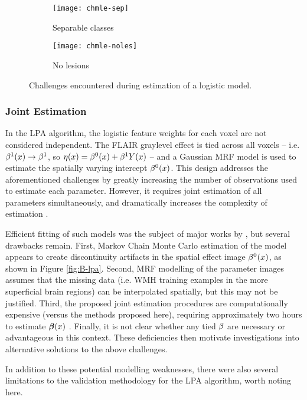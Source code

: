\begin{figure}
  \centering
  \begin{subfigure}{\plotwidth}\texttt{[image: chmle-sep]}  \caption{Separable classes}\label{fig:chmle-sep}  \end{subfigure}
  \begin{subfigure}{\plotwidth}\texttt{[image: chmle-noles]}\caption{No lesions}       \label{fig:chmle-noles}\end{subfigure}
  \caption{Challenges encountered during estimation of a logistic model.}
  \label{fig:chmle}
\end{figure}
\subsubsection{Joint Estimation}
In the LPA algorithm, the logistic feature weights for each voxel are not considered independent.
The FLAIR graylevel effect is tied across all voxels -- i.e. $\beta^1(x) \rightarrow \beta^1$, so $\eta(x) = \beta^0(x) + \beta^1Y(x)$ -- and a Gaussian MRF model is used to estimate the spatially varying intercept $\beta^0(x)$.
This design addresses the aforementioned challenges by greatly increasing the number of observations used to estimate each parameter.
However, it requires joint estimation of all parameters simultaneously, and dramatically increases the complexity of estimation \cite{Schmidt2017a}.
\par
Efficient fitting of such models was the subject of major works by \citeauthor{Schmidt2017} \cite{Schmidt2017,Schmidt2017a}, but several drawbacks remain.
First, Markov Chain Monte Carlo estimation of the model appears to create discontinuity artifacts in the spatial effect image $\beta^0(x)$, as shown in Figure \ref{fig:B-lpa}.
Second, MRF modelling of the parameter images assumes that the missing data (i.e. WMH training examples in the more superficial brain regions) can be interpolated spatially, but this may not be justified.
Third, the proposed joint estimation procedures are computationally expensive (versus the methods proposed here), requiring approximately two hours to estimate $\bm{\beta}(x)$ \cite{Schmidt2017a}.
Finally, it is not clear whether any tied $\beta$ are necessary or advantageous in this context.
These deficiencies then motivate investigations into alternative solutions to the above challenges.
\par
In addition to these potential modelling weaknesses, there were also several limitations to the validation methodology for the LPA algorithm, worth noting here.
